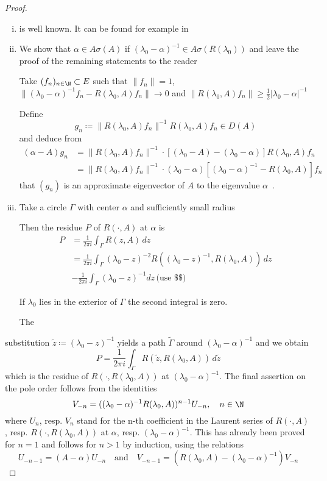 \begin{proof}
\begin{enumerate}[(i)]
\item is well known. It can be found for example in \citet[VII.9.2]{dunfordschwartz:1958}

\item We show that $\alpha \in A\sigma(A)$ if $(\lambda_{0}-\alpha)^{-1} \in A\sigma(R(\lambda_{0}))$ and leave the proof of the remaining statements to the reader

Take $(f_{n})_{n \in \N} \subset E$ such that $\|f_{n}\| = 1$, $\|(\lambda_{0}-\alpha)^{-1}f_{n} - R(\lambda_{0},A)f_{n}\| \to 0$ and $\|R(\lambda_{0},A)f_{n}\| \geq \frac{1}{2}|\lambda_{0} - \alpha|^{-1}$

Define
\[
g_{n} \coloneqq \|R(\lambda_{0},A)f_{n}\|^{-1}R(\lambda_{0},A)f_{n} \in D(A)
\]
and deduce from
\begin{align*}
(\alpha-A)g_{n} &= \|R(\lambda_{0},A)f_{n}\|^{-1} \cdot [(\lambda_{0}-A) - (\lambda_{0}-\alpha)]R(\lambda_{0},A)f_{n} \\
&= \|R(\lambda_{0},A)f_{n}\|^{-1} \cdot (\lambda_{0}-\alpha)[(\lambda_{0}-\alpha)^{-1} - R(\lambda_{0},A)]f_{n}
\end{align*}
that $(g_{n})$ is an approximate eigenvector of $A$ to the eigenvalue $\alpha$~.

\item Take a circle $\Gamma$ with center $\alpha$ and sufficiently small radius

Then the residue $P$ of $R(\cdot,A)$ at $\alpha$ is
\begin{align*}
P &= \frac{1}{2\pi i} \int_{\Gamma} R(z,A) \, dz \\
&= \frac{1}{2\pi i} \int_{\Gamma} (\lambda_{0}-z)^{-2}R((\lambda_{0}-z)^{-1},R(\lambda_{0},A)) \, dz \\
&- \frac{1}{2\pi i} \int_{\Gamma}(\lambda_{0}-z)^{-1}dz \, \text{(use \$\$)}
\end{align*}

If $\lambda_{0}$ lies in the exterior of $\Gamma$ the second integral is zero.

The
\end{enumerate}

\newpage
substitution $\tilde{z} \coloneqq (\lambda_{0} - z)^{-1}$ yields a path $\tilde{\Gamma}$ around $(\lambda_{0}-\alpha)^{-1}$ and we obtain
\[
P = \frac{1}{2\pi i} \int_{\Gamma} R(\tilde{z},R(\lambda_{0},A)) \, d\tilde{z}
\]
which is the residue of $R(\cdot,R(\lambda_{0},A))$ at $(\lambda_{0}-\alpha)^{-1}$.
The final assertion on the pole order follows from the identities
\[
V_{-n} = ((\lambda_{0}-\alpha)^{-1}R(\lambda_{0},A))^{n-1}U_{-n}, \quad n \in \N
\]
where $U_{n}$, resp. $V_{n}$ stand for the n-th coefficient in the Laurent series of $R(\cdot,A)$, resp. $R(\cdot,R(\lambda_{0},A))$ at $\alpha$, resp. $(\lambda_{0}-\alpha)^{-1}$.
This has already been proved for $n = 1$ and follows for $n > 1$ by induction, using the relations
\[
U_{-n-1} = (A - \alpha)U_{-n} \quad \text{and} \quad V_{-n-1} = (R(\lambda_{0},A) - (\lambda_{0}-\alpha)^{-1})V_{-n}
\]


\end{proof}
